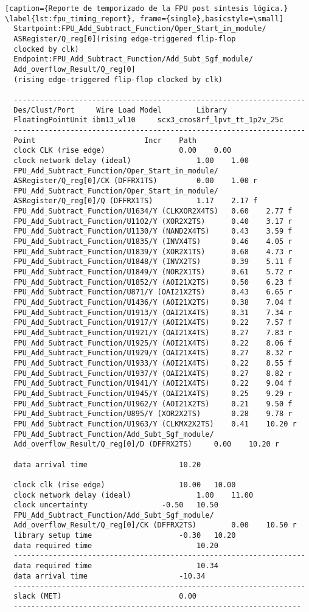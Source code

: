 \begin{lstlisting}[caption={Reporte de temporizado de la FPU post síntesis lógica.} \label{lst:fpu_timing_report}, frame={single},basicstyle=\small]
  Startpoint:FPU_Add_Subtract_Function/Oper_Start_in_module/
  ASRegister/Q_reg[0](rising edge-triggered flip-flop 
  clocked by clk)
  Endpoint:FPU_Add_Subtract_Function/Add_Subt_Sgf_module/
  Add_overflow_Result/Q_reg[0]
  (rising edge-triggered flip-flop clocked by clk)
    
  -------------------------------------------------------------------
  Des/Clust/Port     Wire Load Model       	Library
  FloatingPointUnit	ibm13_wl10     scx3_cmos8rf_lpvt_tt_1p2v_25c
  -------------------------------------------------------------------
  Point							Incr	Path
  clock CLK (rise edge)					0.00	0.00
  clock network delay (ideal)				1.00	1.00
  FPU_Add_Subtract_Function/Oper_Start_in_module/
  ASRegister/Q_reg[0]/CK (DFFRX1TS)			0.00	1.00 r
  FPU_Add_Subtract_Function/Oper_Start_in_module/
  ASRegister/Q_reg[0]/Q (DFFRX1TS)			1.17	2.17 f
  FPU_Add_Subtract_Function/U1634/Y (CLKXOR2X4TS)	0.60	2.77 f
  FPU_Add_Subtract_Function/U1102/Y (XOR2X2TS)		0.40	3.17 r
  FPU_Add_Subtract_Function/U1130/Y (NAND2X4TS)		0.43    3.59 f
  FPU_Add_Subtract_Function/U1835/Y (INVX4TS)		0.46	4.05 r
  FPU_Add_Subtract_Function/U1839/Y (XOR2X1TS)		0.68	4.73 r
  FPU_Add_Subtract_Function/U1848/Y (INVX2TS)		0.39	5.11 f
  FPU_Add_Subtract_Function/U1849/Y (NOR2X1TS)		0.61	5.72 r
  FPU_Add_Subtract_Function/U1852/Y (AOI21X2TS)		0.50	6.23 f
  FPU_Add_Subtract_Function/U871/Y (OAI21X2TS)		0.43	6.65 r
  FPU_Add_Subtract_Function/U1436/Y (AOI21X2TS)		0.38	7.04 f
  FPU_Add_Subtract_Function/U1913/Y (OAI21X4TS)		0.31	7.34 r
  FPU_Add_Subtract_Function/U1917/Y (AOI21X4TS)		0.22	7.57 f
  FPU_Add_Subtract_Function/U1921/Y (OAI21X4TS)		0.27	7.83 r
  FPU_Add_Subtract_Function/U1925/Y (AOI21X4TS)		0.22	8.06 f
  FPU_Add_Subtract_Function/U1929/Y (OAI21X4TS)		0.27	8.32 r
  FPU_Add_Subtract_Function/U1933/Y (AOI21X4TS)		0.22	8.55 f
  FPU_Add_Subtract_Function/U1937/Y (OAI21X4TS)		0.27	8.82 r
  FPU_Add_Subtract_Function/U1941/Y (AOI21X4TS)		0.22	9.04 f
  FPU_Add_Subtract_Function/U1945/Y (OAI21X4TS)		0.25	9.29 r
  FPU_Add_Subtract_Function/U1962/Y (AOI21X2TS)		0.21	9.50 f
  FPU_Add_Subtract_Function/U895/Y (XOR2X2TS)		0.28	9.78 r
  FPU_Add_Subtract_Function/U1963/Y (CLKMX2X2TS)	0.41	10.20 r
  FPU_Add_Subtract_Function/Add_Subt_Sgf_module/
  Add_overflow_Result/Q_reg[0]/D (DFFRX2TS)		0.00	10.20 r
  
  data arrival time						10.20

  clock clk (rise edge)					10.00	10.00
  clock network delay (ideal)				1.00	11.00
  clock uncertainty					-0.50	10.50
  FPU_Add_Subtract_Function/Add_Subt_Sgf_module/
  Add_overflow_Result/Q_reg[0]/CK (DFFRX2TS)		0.00	10.50 r
  library setup time					-0.30	10.20
  data required time						10.20
  -------------------------------------------------------------------
  data required time						10.34
  data arrival time						-10.34
  -------------------------------------------------------------------
  slack (MET)							0.00
  ------------------------------------------------------------------
\end{lstlisting}

